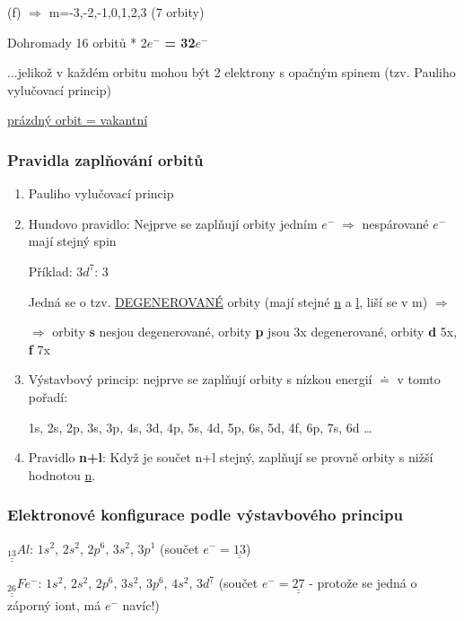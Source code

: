     (f) $\Rightarrow$ m=-3,-2,-1,0,1,2,3 (7 orbity)

\medskip
Dohromady 16 orbitů * 2$e^-$ \textbf{= 32$e^-$}

...jelikož v každém orbitu mohou být 2 elektrony s opačným spinem (tzv. Pauliho vylučovací princip)

\bigskip
\fbox{\;\;} \underline{prázdný orbit = vakantní}

\subsubsection{Pravidla zaplňování orbitů}
\begin{enumerate}
    \item Pauliho vylučovací princip
    \item Hundovo pravidlo: Nejprve se zaplňují orbity jedním $e^- \; \Rightarrow$ nespárované $e^-$ mají stejný spin
    
    Příklad: $3d^7$: 3 \fbox{$\downarrow\textcolor{magenta}{\uparrow}$}\fbox{$\downarrow\textcolor{magenta}{\uparrow}$}\fbox{$\downarrow\textcolor{magenta}{.}$}\fbox{$\downarrow\textcolor{magenta}{.}$}\fbox{$\downarrow\textcolor{magenta}{.}$}
    
    Jedná se o tzv. \underline{DEGENEROVANÉ} orbity (mají stejné \underline{n} a \underline{l}, liší se v m) $\Rightarrow$
    
    $\Rightarrow$ orbity \textbf{s} nesjou degenerované, orbity \textbf{p} jsou 3x degenerované, orbity \textbf{d} 5x, \textbf{f} 7x
    \item Výstavbový princip: nejprve se zaplňují orbity s nízkou energií $\doteq$ v tomto pořadí:
    
    1s, 2s, 2p, 3s, 3p, 4s, 3d, 4p, 5s, 4d, 5p, 6s, 5d, 4f, 6p, 7s, 6d \dots
    \item Pravidlo \textbf{n+l}: Když je součet n+l stejný, zaplňují se provně orbity s nižší hodnotou \underline{n}.
\end{enumerate}

\subsubsection{Elektronové konfigurace podle výstavbového principu}
$\underline{\underline{_{13}}}Al$: $1s^2$, $2s^2$, $2p^6$, $3s^2$, $3p^1$ (součet $e^- = \underline{\underline{13}}$)

$\underline{\underline{_{26}}}Fe^-$: $1s^2$, $2s^2$, $2p^6$, $3s^2$, $3p^6$, $4s^2$, $3d^{\underline{7}}$ (součet $e^- = \underline{\underline{27}}$ - protože se jedná o záporný iont, má $e^-$ navíc!)

